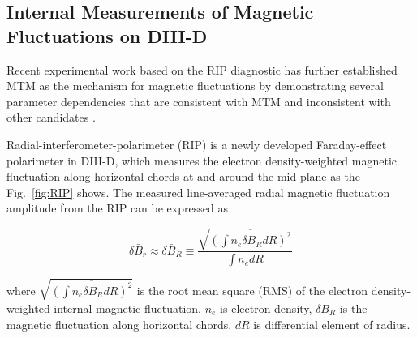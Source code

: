 \documentclass[
 aip,
 amsmath,amssymb,
 reprint
]{revtex4-1}
\begin{document}




\subsection{Internal Measurements of Magnetic Fluctuations on DIII-D}

Recent experimental work based on the RIP diagnostic has further established MTM as the mechanism for magnetic fluctuations by demonstrating several parameter dependencies that are consistent with MTM and inconsistent with other candidates \cite{RIP_Chen_POP_2021}.  

Radial-interferometer-polarimeter (RIP) is a newly developed Faraday-effect polarimeter in DIII-D, which measures the electron density-weighted magnetic fluctuation along horizontal chords at and around the mid-plane as the Fig.~\ref{fig:RIP} shows. The measured line-averaged radial magnetic fluctuation amplitude from the RIP can be expressed as 

\begin{equation}
\delta \bar{B}_{r} \approx \delta \bar{B}_{R} \equiv \frac{\sqrt{\overline{\left(\int n_{e} \delta B_{R} d R\right)^{2}}}}{\int n_{e} d R}
\label{eq:RIP_Br}
\end{equation}%




\noindent where $\sqrt{\overline{\left(\int n_{e} \delta B_{R} d R\right)^{2}}}$ is the root mean square (RMS) of the electron density-weighted internal magnetic fluctuation. \cite{RIP_Chen_POP_2020} $n_e$ is electron density, $\delta B_R$ is the magnetic fluctuation along horizontal chords. $dR$ is differential element of radius. 
\end{document}
